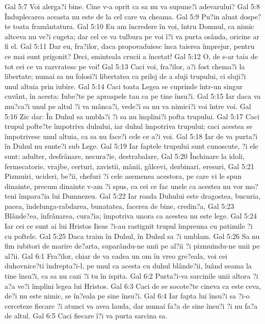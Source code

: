 Gal 5:7  Voi alerga?i bine. Cine v-a oprit ca sa nu va supune?i adevarului?
Gal 5:8  Înduplecarea aceasta nu este de la cel care va cheama.
Gal 5:9  Pu?in aluat dospe?te toata framântatura.
Gal 5:10  Eu am încredere în voi, întru Domnul, ca nimic altceva nu ve?i cugeta; dar cel ce va tulbura pe voi î?i va purta osânda, oricine ar fi el.
Gal 5:11  Dar eu, fra?ilor, daca propovaduiesc înca taierea împrejur, pentru ce mai sunt prigonit? Deci, sminteala crucii a încetat!
Gal 5:12  O, de s-ar taia de tot cei ce va razvratesc pe voi!
Gal 5:13  Caci voi, fra?ilor, a?i fost chema?i la libertate; numai sa nu folosi?i libertatea ca prilej de a sluji trupului, ci sluji?i unul altuia prin iubire.
Gal 5:14  Caci toata Legea se cuprinde într-un singur cuvânt, în acesta: Iube?te pe aproapele tau ca pe tine însu?i.
Gal 5:15  Iar daca va mu?ca?i unul pe altul ?i va mânca?i, vede?i sa nu va nimici?i voi între voi.
Gal 5:16  Zic dar: În Duhul sa umbla?i ?i sa nu împlini?i pofta trupului.
Gal 5:17  Caci trupul pofte?te împotriva duhului, iar duhul împotriva trupului; caci acestea se împotrivesc unul altuia, ca sa nu face?i cele ce a?i voi.
Gal 5:18  Iar de va purta?i în Duhul nu sunte?i sub Lege.
Gal 5:19  Iar faptele trupului sunt cunoscute, ?i ele sunt: adulter, desfrânare, necura?ie, destrabalare,
Gal 5:20  Închinare la idoli, fermecatorie, vrajbe, certuri, zavistii, mânii, gâlcevi, dezbinari, eresuri,
Gal 5:21  Pizmuiri, ucideri, be?ii, chefuri ?i cele asemenea acestora, pe care vi le spun dinainte, precum dinainte v-am ?i spus, ca cei ce fac unele ca acestea nu vor mo?teni împara?ia lui Dumnezeu.
Gal 5:22  Iar roada Duhului este dragostea, bucuria, pacea, îndelunga-rabdarea, bunatatea, facerea de bine, credin?a,
Gal 5:23  Blânde?ea, înfrânarea, cura?ia; împotriva unora ca acestea nu este lege.
Gal 5:24  Iar cei ce sunt ai lui Hristos Iisus ?i-au rastignit trupul împreuna cu patimile ?i cu poftele.
Gal 5:25  Daca traim în Duhul, în Duhul sa ?i umblam.
Gal 5:26  Sa nu fim iubitori de marire de?arta, suparându-ne unii pe al?ii ?i pizmuindu-ne unii pe al?ii.
Gal 6:1  Fra?ilor, chiar de va cadea un om în vreo gre?eala, voi cei duhovnice?ti îndrepta?i-l, pe unul ca acesta cu duhul blânde?ii, luând seama la tine însu?i, ca sa nu cazi ?i tu în ispita.
Gal 6:2  Purta?i-va sarcinile unii altora ?i a?a ve?i împlini legea lui Hristos.
Gal 6:3  Caci de se socote?te cineva ca este ceva, de?i nu este nimic, se în?eala pe sine însu?i.
Gal 6:4  Iar fapta lui însu?i sa ?i-o cerceteze fiecare ?i atunci va avea lauda, dar numai fa?a de sine însu?i ?i nu fa?a de altul.
Gal 6:5  Caci fiecare î?i va purta sarcina sa.
